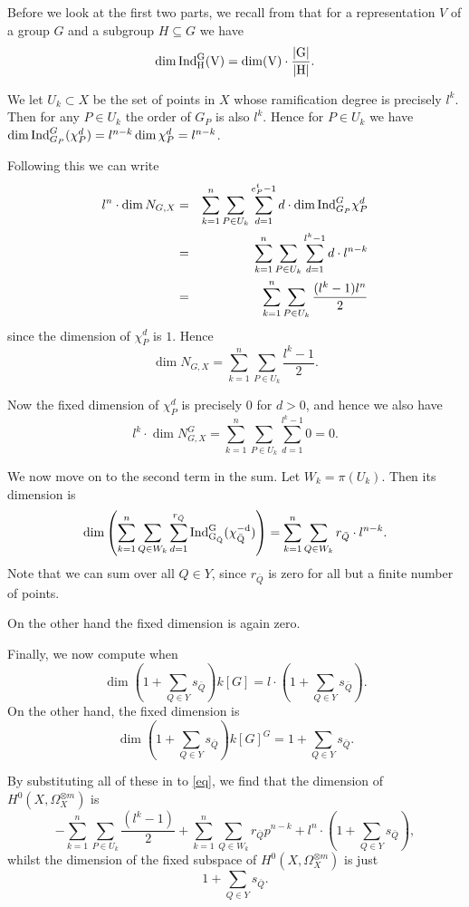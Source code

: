 \documentclass[11pt]{article} %
\theoremstyle{remark}\newtheorem*{rem}{Remark}
\begin{document}
Before we look at the first two parts, we recall from \citep[Rem. 4.30]{introtoreps} that for a representation $V$ of a group $G$ and a subgroup $H\subseteq G$ we have
\[
  \dim \rm{Ind}_H^G(V) = \dim(V)\cdot\frac{|G|}{|H|}.
\]

We let $U_k\subset X$ be the set of points in $X$ whose ramification degree is precisely $l^k$.
Then for any $P\in U_k$ the order of $G_P$ is also $l^k$.
Hence for $P\in U_k$ we have $\dim {\rm Ind}_{G_P}^G(\chi_P^d) = l^{n-k} \dim \chi_P^d = l^{n-k}$.



Following this we can write 
\begin{eqnarray*}
 l^n \cdot \dim N_{G,X} & = & \sum_{k=1}^n \sum_{P\in U_k} \sum_{d=1}^{e^t_P -1} d\cdot \dim {\rm Ind}_{G_P}^G\chi_P^d \\
 & = & \sum_{k=1}^n \sum_{P\in U_k} \sum_{d=1}^{l^k -1} d\cdot l^{n-k} \\
 & = & \sum_{k=1}^n \sum_{P\in U_k} \frac{(l^k-1)l^n}{2}
\end{eqnarray*}
since the dimension of $\chi^d_P$ is $1$.
Hence
\[
 \dim N_{G,X} = \sum_{k=1}^n \sum_{P\in U_k}  \frac{l^k-1}{2}.
\]

Now the fixed dimension of $\chi^d_P$ is precisely 0 for $d>0$, and hence we also have
\[
 l^k\cdot \dim N_{G,X}^G = \sum_{k=1}^n \sum_{P\in U_k} \sum_{d=1}^{l^k-1} 0 = 0.
\]

We now move on to the second term in the sum.
Let $W_k=\pi (U_k)$.
Then its dimension is
\[
 \dim \left(\sum_{k=1}^n \sum_{Q\in W_k} \sum_{d=1}^{r_{\bar Q}} \rm{Ind}_{G_{\bar Q}}^G (\chi_{\bar Q}^{-d})\right) = \sum_{k=1}^n \sum_{Q\in W_k} r_{\bar Q}\cdot l^{n-k}.
\]
Note that we can sum over all $Q\in Y$, since $r_{\bar Q}$ is zero for all but a finite number of points.


On the other hand the fixed dimension is again zero.


Finally, we now compute when 
\[
 \dim \left( 1 + \sum_{Q\in Y} s_{\bar Q} \right) k[G] = l\cdot \left( 1 + \sum_{Q\in Y} s_{\bar Q} \right).
 \]
On the other hand, the fixed dimension is
\[
\dim \left( 1 + \sum_{Q\in Y} s_{\bar Q} \right) k[G]^G = 1 + \sum_{Q\in Y} s_{\bar Q}.
\]

By substituting all of these in to \ref{eq}, we find that the dimension of $H^0(X,\Omega_X^{\otimes m})$ is
\[
 -\sum_{k=1}^n \sum_{P\in U_k} \frac{(l^k-1)}{2} + \sum_{k=1}^n \sum_{Q\in W_k} r_{\bar Q} p^{n-k} + l^n\cdot \left( 1 + \sum_{Q\in Y} s_{\bar Q} \right),
\]
whilst the dimension of the fixed subspace of $H^0(X,\Omega_X^{\otimes m})$ is just
\[
 1 + \sum_{Q\in Y} s_{\bar Q}.
\]
\end{document}
